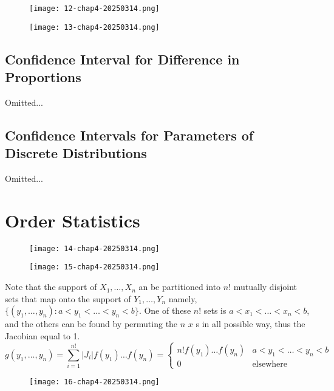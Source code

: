 \begin{figure}[H]
\centering
\texttt{[image: 12-chap4-20250314.png]}
\label{}
\end{figure}

\begin{figure}[H]
\centering
\texttt{[image: 13-chap4-20250314.png]}
\label{}
\end{figure}

\subsection{Confidence Interval for Difference in Proportions}

Omitted...

\subsection{Confidence Intervals for Parameters of Discrete Distributions}

Omitted...

\section{Order Statistics}

\begin{definition}
\begin{figure}[H]
\centering
\texttt{[image: 14-chap4-20250314.png]}
\label{}
\end{figure}
\end{definition}
\begin{figure}[H]
\centering
\texttt{[image: 15-chap4-20250314.png]}
\label{}
\end{figure}

Note that the support of $X_1,\dots,X_n$ an be partitioned into $n!$ mutually disjoint sets that map onto the support of $Y_1,\dots,Y_n$ namely, $\{ (y_1,\dots,y_n):a<y_1<\dots<y_n<b \}$. One of these $n!$ sets is $a<x_1<\dots<x_n<b$, and the others can be found by permuting the $n$ $x$ s in all possible way, thus the Jacobian equal to 1.
\[
g(y_1,\dots,y_n)=\sum_{i=1}^{n!} \lvert J_i \rvert f(y_1)\dots f(y_n)=\begin{cases}
n!f(y_1)\dots f(y_n) & a<y_1<\dots<y_n<b \\
0 & \text{elsewhere}
\end{cases}
\]
\begin{figure}[H]
\centering
\texttt{[image: 16-chap4-20250314.png]}
\label{}
\end{figure}


